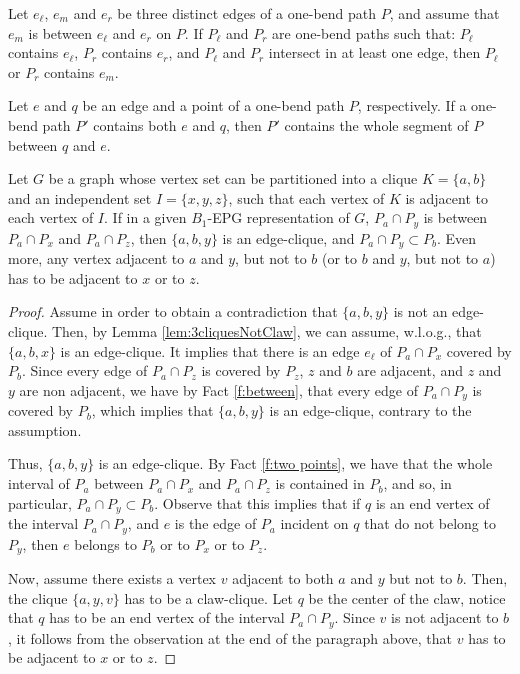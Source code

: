 \begin{fac} \label{f:between}Let $e_{\ell}$, $e_m$ and $e_r$  be three distinct edges of a  one-bend path $P$, and assume that $e_m$ is between $e_{\ell}$ and $e_r$ on $P$. If $P_{\ell}$ and $P_r$ are one-bend paths such that: $P_{\ell}$ contains $e_{\ell}$, $P_r$ contains $e_r$, and  $P_{\ell}$ and $P_r$ intersect in at least one edge, then $P_{\ell}$ or $P_r$ contains $e_m$.
\end{fac}
\begin{fac} \label{f:two points} Let  $e$ and $q$  be an edge and a  point  of a  one-bend path $P$, respectively. If a one-bend path $P'$ contains both $e$ and $q$, then $P'$ contains the whole segment of $P$ between $q$ and $e$.
\end{fac}

\begin{lema}\label{l:abclique}
Let $G$ be a graph whose vertex set  can be partitioned into a clique $K=\{a,b\}$ and an independent set $I=\{x,y,z\}$, such that each vertex of $K$ is adjacent to each vertex of $I$.
If in a given $B_1$-EPG representation of $G$, $P_a\cap P_y$ is between $P_a\cap P_x$ and $P_a\cap P_z$, then $\{a,b,y\}$ is an edge-clique, and
$P_a\cap P_y \subset P_b$. Even more, any vertex adjacent to $a$ and $y$, but not to $b$ (or to $b$ and $y$, but not to $a$) has to be adjacent to $x$ or to $z$.
\end{lema}

\begin{proof}
Assume in order to obtain a contradiction that $\{a,b,y\}$ is not an edge-clique. Then, by Lemma
\ref{lem:3cliquesNotClaw}, we can assume, w.l.o.g., that $\{a,b,x\}$ is an edge-clique.
It implies that there is an edge $e_{\ell}$ of $P_a \cap P_x$ covered by $P_b$. Since every  edge
of $P_a\cap P_z$ is covered  by $P_z$, $z$ and $b$ are adjacent, and $z$ and $y$ are non adjacent, we have by Fact \ref{f:between},
that every edge of $P_a\cap P_y$ is covered by $P_b$, which implies  that $\{a,b,y\}$ is an edge-clique, contrary to the assumption.

Thus, $\{a,b,y\}$ is an edge-clique. By Fact \ref{f:two points}, we have that the whole interval of $P_a$ between 
 $P_a \cap P_x$ and   $P_a \cap P_z$ is contained in $P_b$, and so, in particular, $P_a\cap P_y \subset P_b$. Observe that this
 implies that if $q$ is an end vertex of the interval $P_a \cap P_y$, and $e$ is the edge of $P_a$ incident on $q$ that do not belong to $P_y$, then 
$e$ belongs to $P_b$ or to $P_x$ or to $P_z$.
 
 Now, assume there exists a vertex $v$ adjacent to both $a$ and $y$ but not to $b$. Then, the clique $\{a,y,v\}$ has to be a claw-clique. Let $q$ be the center of the claw, notice that $q$ has to be an end vertex of the interval $P_a \cap P_y$.
 Since $v$ is not adjacent to $b$, it follows from the observation at the end of the paragraph above, that
 $v$ has to be adjacent to $x$ or to $z$.
\end{proof}

